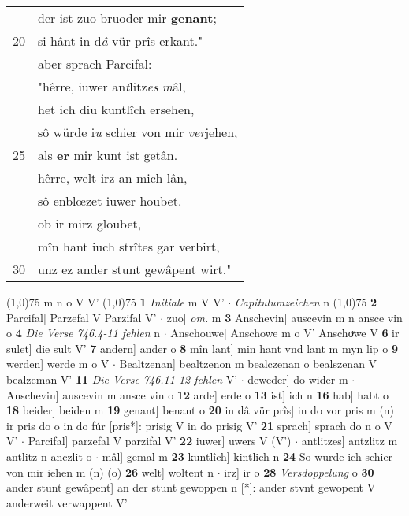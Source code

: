 \documentclass[8pt,a4paper,notitlepage]{article}
\begin{document}
\begin{table}[ht]
\begin{minipage}[t]{0.5\linewidth}
\begin{tabular}{rl}
 & der ist zuo bruoder mir \textbf{genant};\\ 
20 & si hânt in d\textit{â} vür prîs erkant."\\ 
 & aber sprach Parcifal:\\ 
 & "hêrre, iuwer an\textit{t}litz\textit{es} \textit{m}âl,\\ 
 & het ich diu kuntlîch ersehen,\\ 
 & sô würde i\textit{u} schier von mir \textit{ver}jehen,\\ 
25 & als \textbf{er} mir kunt ist getân.\\ 
 & hêrre, welt irz an mich lân,\\ 
 & sô enblœzet iuwer houbet.\\ 
 & ob ir mirz gloubet,\\ 
 & mîn hant iuch strîtes gar verbirt,\\ 
30 & unz ez ander stunt gewâpent wirt."\\ 
\end{tabular}
\scriptsize
\line(1,0){75} \newline
m n o V V' \newline
\line(1,0){75} \newline
\textbf{1} \textit{Initiale} m V V'   $\cdot$ \textit{Capitulumzeichen} n  \newline
\line(1,0){75} \newline
\textbf{2} Parcifal] Parzefal V Parzifal V'  $\cdot$ zuo] \textit{om.} m \textbf{3} Anschevin] auscevin m n ansce vin o \textbf{4} \textit{Die Verse 746.4-11 fehlen} n   $\cdot$ Anschouwe] Anschowe m o V' Anschoͮwe V \textbf{6} ir sulet] die sult V' \textbf{7} andern] ander o \textbf{8} mîn lant] min hant vnd lant m myn lip o \textbf{9} werden] werde m o V  $\cdot$ Bealtzenan] bealtzenon m bealczenan o bealszenan V bealzeman V' \textbf{11} \textit{Die Verse 746.11-12 fehlen} V'   $\cdot$ deweder] do wider m  $\cdot$ Anschevin] auscevin m ansce vin o \textbf{12} arde] erde o \textbf{13} ist] ich n \textbf{16} hab] habt o \textbf{18} beider] beiden m \textbf{19} genant] benant o \textbf{20} in dâ vür prîs] in do vor pris m (n) ir pris do o in do fúr [pris*]: prisig V in do prisig V' \textbf{21} sprach] sprach do n o V V'  $\cdot$ Parcifal] parzefal V parzifal V' \textbf{22} iuwer] uwers V (V')  $\cdot$ antlitzes] antzlitz m antlitz n anczlit o  $\cdot$ mâl] gemal m \textbf{23} kuntlîch] kintlich n \textbf{24} So wurde ich schier von mir iehen m (n) (o) \textbf{26} welt] woltent n  $\cdot$ irz] ir o \textbf{28} \textit{Versdoppelung} o  \textbf{30} ander stunt gewâpent] an der stunt gewoppen n [*]: ander stvnt gewopent V anderweit verwappent V' \newline
\end{minipage}
\end{table}
\end{document}
